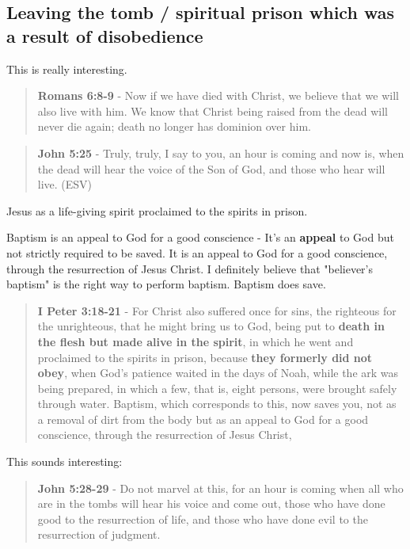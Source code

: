 \documentclass[11pt]{article}
\begin{document}
\subsection{Leaving the tomb / spiritual prison which was a result of disobedience}
\label{sec:orgbb046ff}
This is really interesting.

\begin{quote}
\textbf{Romans 6:8-9} - Now if we have died with Christ, we believe that we will also live with him. We know that Christ being raised from the dead will never die again; death no longer has dominion over him.
\end{quote}

\begin{quote}
\textbf{John 5:25} - Truly, truly, I say to you, an hour is coming and now is, when the dead will hear the voice of the Son of God, and those who hear will live. (ESV)
\end{quote}

Jesus as a life-giving spirit proclaimed to the spirits in prison.

Baptism is an appeal to God for a good conscience - It's an \textbf{appeal} to God but not strictly required to be saved.
It is an appeal to God for a good conscience, through the resurrection of Jesus Christ.
I definitely believe that "believer's baptism" is the right way to perform baptism.
Baptism does save.

\begin{quote}
\textbf{I Peter 3:18-21} - For Christ also suffered once for sins, the righteous for the unrighteous, that he might bring us to God, being put to \textbf{death in the flesh but made alive in the spirit}, in which he went and proclaimed to the spirits in prison, because \textbf{they formerly did not obey}, when God's patience waited in the days of Noah, while the ark was being prepared, in which a few, that is, eight persons, were brought safely through water. Baptism, which corresponds to this, now saves you, not as a removal of dirt from the body but as an appeal to God for a good conscience, through the resurrection of Jesus Christ,
\end{quote}

This sounds interesting:

\begin{quote}
\textbf{John 5:28-29} - Do not marvel at this, for an hour is coming when all who are in the tombs will hear his voice and come out, those who have done good to the resurrection of life, and those who have done evil to the resurrection of judgment.
\end{quote}
\end{document}
